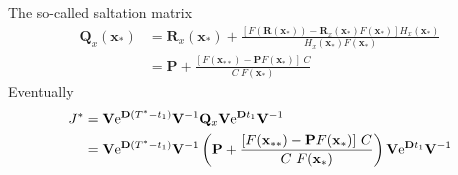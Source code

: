\documentclass[a4paper,10pt]{article}
\begin{document}
The so-called saltation matrix 
\begin{align}
	\nonumber
	\mathbf{Q}_x (\mathbf{x}_*) &= \mathbf{R}_x(\mathbf{x}_*)+\frac{[F(\mathbf{R}(\mathbf{x}_*))-\mathbf{R}_x(\mathbf{x}_*)F(\mathbf{x}_*)]H_x(\mathbf{x}_*)}{H_x(\mathbf{x}_*)F(\mathbf{x}_*)}\\
	&=\mathbf{P}+ \frac{[F(\mathbf{x}_{**})-\mathbf{P}F(\mathbf{x}_*)]~C}{C~F(\mathbf{x}_*)}
\end{align}
Eventually
\begin{align}
	J^*	 &= \mathbf{V} {\rm e}^{\mathbf{D} (T^*-t_1)} 
	\mathbf{V}^{-1} \mathbf{Q}_x \mathbf{V} {\rm e}^{\mathbf{D} t_1} 
	\mathbf{V}^{-1}\\
	& = \mathbf{V} {\rm e}^{\mathbf{D} (T^*-t_1)} 
	\mathbf{V}^{-1} \left( \mathbf{P}+ \frac{[F(\mathbf{x}_{**})-\mathbf{P}F(\mathbf{x}_*)]~C}{C~F(\mathbf{x}_*)} \right)\mathbf{V} {\rm e}^{\mathbf{D} t_1} 
	\mathbf{V}^{-1}
\end{align}
\end{document}
